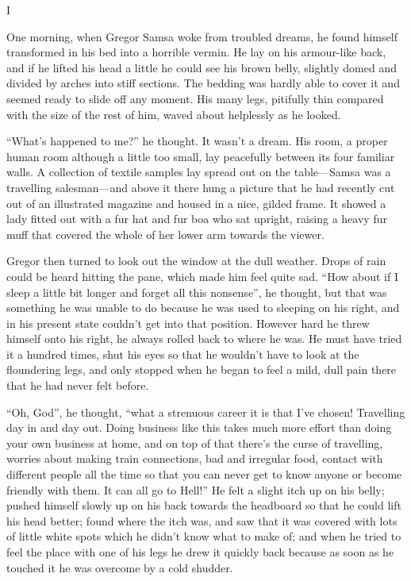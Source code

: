




\skiptorecto
\footlinetrue

\act I

One morning, when Gregor Samsa woke from troubled dreams, he found
himself transformed in his bed into a horrible vermin. He lay on his
armour-like back, and if he lifted his head a little he could see his
brown belly, slightly domed and divided by arches into stiff sections.
The bedding was hardly able to cover it and seemed ready to slide off
any moment. His many legs, pitifully thin compared with the size of the
rest of him, waved about helplessly as he looked.

“What’s happened to me?” he thought. It wasn’t a dream. His room, a
proper human room although a little too small, lay peacefully between
its four familiar walls. A collection of textile samples lay spread out
on the table—Samsa was a travelling salesman—and above it there hung a
picture that he had recently cut out of an illustrated magazine and
housed in a nice, gilded frame. It showed a lady fitted out with a fur
hat and fur boa who sat upright, raising a heavy fur muff that covered
the whole of her lower arm towards the viewer.

Gregor then turned to look out the window at the dull weather. Drops of
rain could be heard hitting the pane, which made him feel quite sad.
“How about if I sleep a little bit longer and forget all this
nonsense”, he thought, but that was something he was unable to do
because he was used to sleeping on his right, and in his present state
couldn’t get into that position. However hard he threw himself onto his
right, he always rolled back to where he was. He must have tried it a
hundred times, shut his eyes so that he wouldn’t have to look at the
floundering legs, and only stopped when he began to feel a mild, dull
pain there that he had never felt before.

“Oh, God”, he thought, “what a strenuous career it is that I’ve chosen!
Travelling day in and day out. Doing business like this takes much more
effort than doing your own business at home, and on top of that there’s
the curse of travelling, worries about making train connections, bad
and irregular food, contact with different people all the time so that
you can never get to know anyone or become friendly with them. It can
all go to Hell!” He felt a slight itch up on his belly; pushed himself
slowly up on his back towards the headboard so that he could lift his
head better; found where the itch was, and saw that it was covered with
lots of little white spots which he didn’t know what to make of; and
when he tried to feel the place with one of his legs he drew it quickly
back because as soon as he touched it he was overcome by a cold
shudder.

